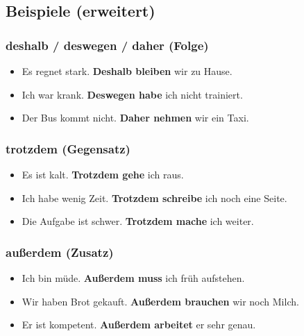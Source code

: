 \documentclass[a4paper,12pt]{article}
\begin{document}
        \subsection{Beispiele (erweitert)}
            
            \subsubsection{deshalb / deswegen / daher (Folge)}
            \begin{itemize}[leftmargin=2em]
					\item Es regnet stark. \textbf{Deshalb bleiben} wir zu Hause.
                    \item Ich war krank. \textbf{Deswegen habe} ich nicht trainiert.
                    \item Der Bus kommt nicht. \textbf{Daher nehmen} wir ein Taxi.
                \end{itemize}
            
            \subsubsection{trotzdem (Gegensatz)}
            \begin{itemize}[leftmargin=2em]
					\item Es ist kalt. \textbf{Trotzdem gehe} ich raus.
                    \item Ich habe wenig Zeit. \textbf{Trotzdem schreibe} ich noch eine Seite.
                    \item Die Aufgabe ist schwer. \textbf{Trotzdem mache} ich weiter.
                \end{itemize}
            
            \subsubsection{au\ss erdem (Zusatz)}
            \begin{itemize}[leftmargin=2em]
					\item Ich bin m\"ude. \textbf{Au\ss erdem muss} ich fr\"uh aufstehen.
                    \item Wir haben Brot gekauft. \textbf{Au\ss erdem brauchen} wir noch Milch.
                    \item Er ist kompetent. \textbf{Au\ss erdem arbeitet} er sehr genau.
                \end{itemize}
            
\end{document}
